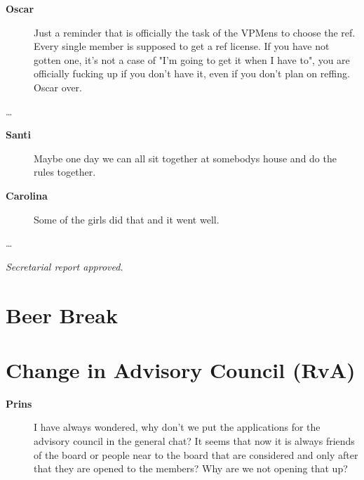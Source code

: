 \documentclass[12pt, a4paper]{article}
\newcommand{\speak}[2]{\begin{description}\item[\textbf{#1}]#2\end{description}}
\begin{document}
\speak{Oscar}{Just a reminder that is officially the task of the VPMens to choose the ref. Every single member is supposed to get a ref license. If you have not gotten one, it's not a case of "I'm going to get it when I have to", you are officially fucking up if you don't have it, even if you don't plan on reffing. Oscar over.}



\dots

\speak{Santi}{Maybe one day we can all sit together at somebodys house and do the rules together.}

\speak{Carolina}{Some of the girls did that and it went well.}


\dots

\textit{Secretarial report approved.}


\section{Beer Break}


\section{Change in Advisory Council (RvA)}

\speak{Prins}{I have always wondered, why don't we put the applications for the advisory council in the general chat? It seems that now it is always friends of the board or people near to the board that are considered and only after that they are opened to the members? Why are we not opening that up?}

\end{document}
